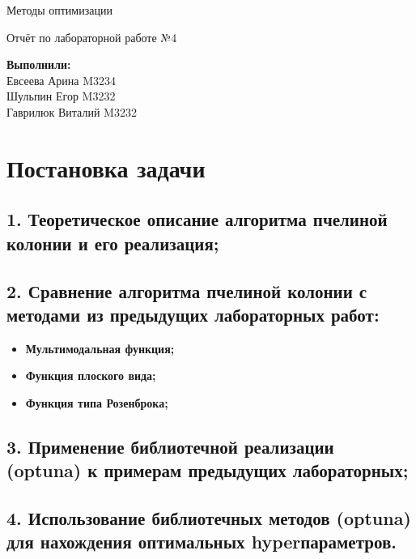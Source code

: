 \documentclass{article}
\begin{document}
\begin{titlepage}
    \bfseries 
        {\centering
            \vspace*{14em}
            \Huge Методы оптимизации\par
            \bigbreak
            Отчёт по лабораторной работе №4 \par
        }
    \vspace{20em}
    \begin{spacing}{2}
        \begin{flushright}
            {\Large \textbf{Выполнили:}}  \\
            {\large Евсеева Арина M3234} \\
            {\large Шульпин Егор M3232} \\
            {\large Гаврилюк Виталий M3232} \\ 
        \end{flushright}
    \end{spacing}
\end{titlepage}

\newpage
\section*{Постановка задачи}
\subsection*{1. Теоретическое описание алгоритма пчелиной колонии и его реализация;}
\subsection*{2. Сравнение алгоритма пчелиной колонии с методами из предыдущих лабораторных работ:}
\begin{itemize}
    \item \textbf{Мультимодальная функция;}
    \item \textbf{Функция плоского вида;}
    \item \textbf{Функция типа Розенброка;}
\end{itemize}
\subsection*{3. Применение библиотечной реализации (optuna) к примерам предыдущих лабораторных;}
\subsection*{4. Использование библиотечных методов (optuna) для нахождения оптимальных hyperпараметров.}
\end{document}
